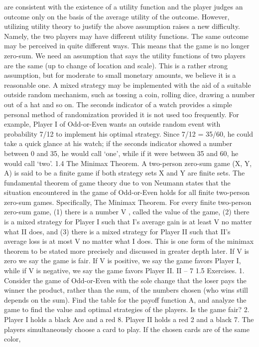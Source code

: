 are consistent with the existence of a utility function and the player judges an outcome
only on the basis of the average utility of the outcome.
However, utilizing utility theory to justify the above assumption raises a new difficulty.
Namely, the two players may have different utility functions. The same outcome may be
perceived in quite different ways. This means that the game is no longer zero-sum. We
need an assumption that says the utility functions of two players are the same (up to
change of location and scale). This is a rather strong assumption, but for moderate to
small monetary amounts, we believe it is a reasonable one.
A mixed strategy may be implemented with the aid of a suitable outside random
mechanism, such as tossing a coin, rolling dice, drawing a number out of a hat and so
on. The seconds indicator of a watch provides a simple personal method of randomization
provided it is not used too frequently. For example, Player I of Odd-or-Even wants an
outside random event with probability 7/12 to implement his optimal strategy. Since
7/12 = 35/60, he could take a quick glance at his watch; if the seconds indicator showed
a number between 0 and 35, he would call ‘one’, while if it were between 35 and 60, he
would call ‘two’.
1.4 The Minimax Theorem. A two-person zero-sum game (X, Y, A) is said to be
a finite game if both strategy sets X and Y are finite sets. The fundamental theorem
of game theory due to von Neumann states that the situation encountered in the game of
Odd-or-Even holds for all finite two-person zero-sum games. Specifically,
The Minimax Theorem. For every finite two-person zero-sum game,
(1) there is a number V , called the value of the game,
(2) there is a mixed strategy for Player I such that I’s average gain is at least V no
matter what II does, and
(3) there is a mixed strategy for Player II such that II’s average loss is at most V no
matter what I does.
This is one form of the minimax theorem to be stated more precisely and discussed in
greater depth later. If V is zero we say the game is fair. If V is positive, we say the game
favors Player I, while if V is negative, we say the game favors Player II.
II – 7
1.5 Exercises.
1. Consider the game of Odd-or-Even with the sole change that the loser pays the
winner the product, rather than the sum, of the numbers chosen (who wins still depends
on the sum). Find the table for the payoff function A, and analyze the game to find the
value and optimal strategies of the players. Is the game fair?
2. Player I holds a black Ace and a red 8. Player II holds a red 2 and a black 7. The
players simultaneously choose a card to play. If the chosen cards are of the same color,
